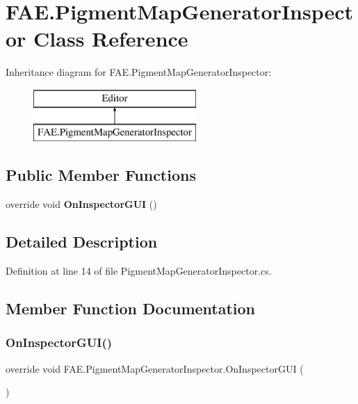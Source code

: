 \section{F\+A\+E.\+Pigment\+Map\+Generator\+Inspector Class Reference}
\label{class_f_a_e_1_1_pigment_map_generator_inspector}
Inheritance diagram for F\+A\+E.\+Pigment\+Map\+Generator\+Inspector\+:\begin{figure}[H]
\begin{center}
\leavevmode
\includegraphics[height=2.000000cm]{class_f_a_e_1_1_pigment_map_generator_inspector}
\end{center}
\end{figure}
\subsection*{Public Member Functions}
\begin{DoxyCompactItemize}
\item 
override void \textbf{ On\+Inspector\+G\+UI} ()
\end{DoxyCompactItemize}


\subsection{Detailed Description}


Definition at line 14 of file Pigment\+Map\+Generator\+Inspector.\+cs.



\subsection{Member Function Documentation}
\mbox{\label{class_f_a_e_1_1_pigment_map_generator_inspector_a36a12c52550a69b60a52ff3fe078f33a}} 
\subsubsection{On\+Inspector\+G\+U\+I()}
{\footnotesize\ttfamily override void F\+A\+E.\+Pigment\+Map\+Generator\+Inspector.\+On\+Inspector\+G\+UI (\begin{DoxyParamCaption}{ }\end{DoxyParamCaption})}



